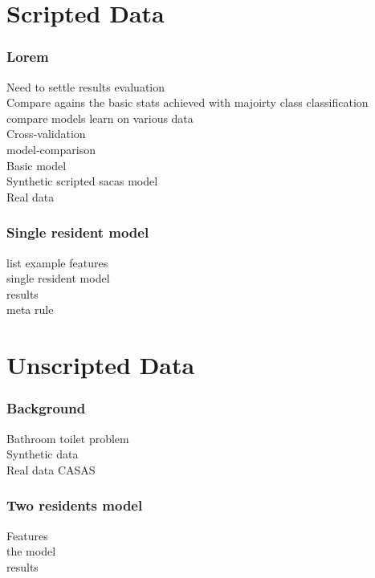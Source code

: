 \documentclass[10pt]{beamer}
\begin{document}
\section{Scripted Data}

\begin{frame}
  \frametitle{Lorem}

Need to settle results evaluation\\
Compare agains the basic stats achieved with majoirty class classification\\
compare models learn on various data\\
Cross-validation\\
model-comparison\\

Basic model\\
Synthetic scripted sacas model\\
Real data\\

\end{frame} 

\begin{frame}[plain]
  \frametitle{Single resident model}
list example features\\

single resident model\\

results\\

meta rule

\end{frame} 

\section{Unscripted Data}
\begin{frame}
  \frametitle{Background}
Bathroom toilet problem\\

Synthetic data\\
Real data CASAS
\end{frame} 

\begin{frame}[plain]
  \frametitle{Two residents model}
Features\\

the model\\

results
\end{frame} 
\end{document}
